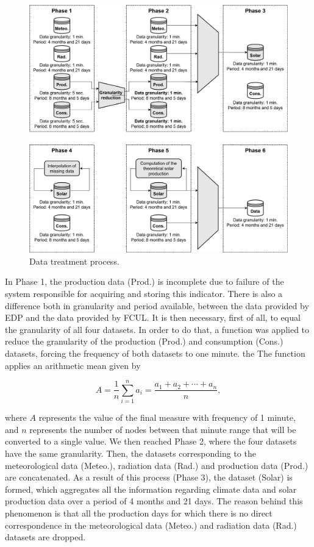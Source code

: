 \begin{figure}[h!]
    \centering
    \begin{center}
    \includegraphics[width=1\textwidth]{Images/Data.png}
    \caption{Data treatment process.}
    \label{datatreatment}
    \end{center}
\end{figure}

In Phase 1, the production data (Prod.) is incomplete due to failure of the system responsible for acquiring and storing this indicator. There is also a difference both in granularity and period available, between the data provided by \ac{EDP} and the data provided by \ac{FCUL}. It is then necessary, first of all, to equal the granularity of all four datasets. In order to do that, a function was applied to reduce the granularity of the production (Prod.) and consumption (Cons.) datasets, forcing the frequency of both datasets to one minute. the  The function applies an arithmetic mean given by 

\begin{equation}
     A={\frac {1}{n}}\sum _{i=1}^{n}a_{i}={\frac {a_{1}+a_{2}+\cdots +a_{n}}{n}},
\label{amean}
\end{equation}

where $A$ represents the value of the final measure with frequency of 1 minute, and $n$ represents the number of nodes between that minute range that will be converted to a single value. We then reached Phase 2, where the four datasets have the same granularity. Then, the datasets corresponding to the meteorological data (Meteo.), radiation data (Rad.) and production data (Prod.) are concatenated. As a result of this process (Phase 3), the dataset (Solar) is formed, which aggregates all the information regarding climate data and solar production data over a period of 4 months and 21 days. The reason behind this phenomenon is that all the production days for which there is no direct correspondence in the meteorological data (Meteo.) and radiation data (Rad.) datasets are dropped. 

